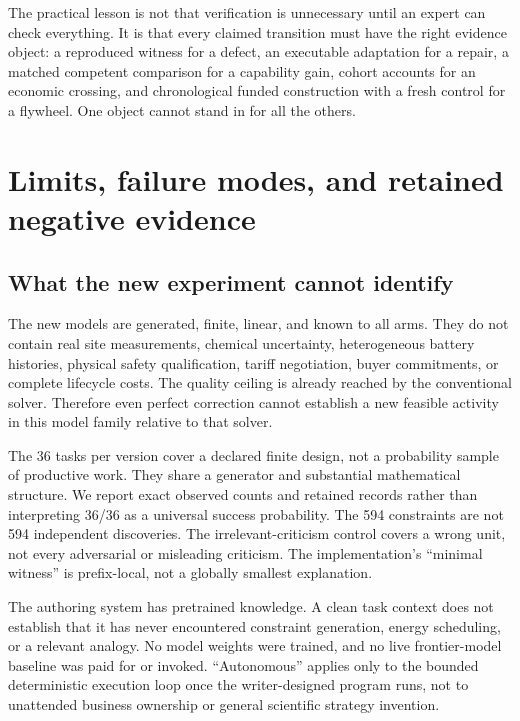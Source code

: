 The practical lesson is not that verification is unnecessary until an
expert can check everything. It is that every claimed transition must
have the right evidence object: a reproduced witness for a defect, an
executable adaptation for a repair, a matched competent comparison for a
capability gain, cohort accounts for an economic crossing, and
chronological funded construction with a fresh control for a flywheel.
One object cannot stand in for all the others.

\section{Limits, failure modes, and retained negative
evidence}\label{limits}

\subsection{What the new experiment cannot
identify}\label{what-the-new-experiment-cannot-identify}

The new models are generated, finite, linear, and known to all arms.
They do not contain real site measurements, chemical uncertainty,
heterogeneous battery histories, physical safety qualification, tariff
negotiation, buyer commitments, or complete lifecycle costs. The quality
ceiling is already reached by the conventional solver. Therefore even
perfect correction cannot establish a new feasible activity in this
model family relative to that solver.

The 36 tasks per version cover a declared finite design, not a
probability sample of productive work. They share a generator and
substantial mathematical structure. We report exact observed counts and
retained records rather than interpreting 36/36 as a universal success
probability. The 594 constraints are not 594 independent discoveries.
The irrelevant-criticism control covers a wrong unit, not every
adversarial or misleading criticism. The implementation's ``minimal
witness'' is prefix-local, not a globally smallest explanation.

The authoring system has pretrained knowledge. A clean task context does
not establish that it has never encountered constraint generation,
energy scheduling, or a relevant analogy. No model weights were trained,
and no live frontier-model baseline was paid for or invoked.
``Autonomous'' applies only to the bounded deterministic execution loop
once the writer-designed program runs, not to unattended business
ownership or general scientific strategy invention.

